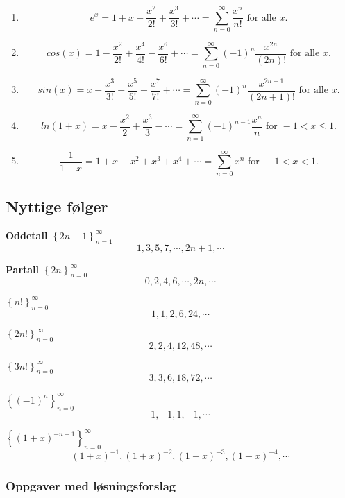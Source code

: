 \documentclass[11pt]{article}
\theoremstyle{definition}
\theoremstyle{definition}
\theoremstyle{definition}
\theoremstyle{definition}
\theoremstyle{definition}
\theoremstyle{definition}
\begin{document}
		\begin{enumerate}
			\item \[e^x=1+x+\dfrac{x^2}{2!}+\dfrac{x^3}{3!}+\cdots=\sum_{n=0}^{\infty}\dfrac{x^n}{n!}\text{ for alle }x. \]
			\item
			\[cos(x)=1-\dfrac{x^2}{2!}+\dfrac{x^4}{4!}-\dfrac{x^6}{6!}+\cdots =\sum_{n=0}^{\infty}(-1)^n\dfrac{x^{2n}}{(2n)!} \text{ for alle }x. \]
			\item
			\[sin(x)=x-\dfrac{x^3}{3!}+\dfrac{x^5}{5!}-\dfrac{x^7}{7!}+\cdots=\sum_{n=0}^{\infty}(-1)^n\dfrac{x^{2n+1}}{(2n+1)!}\text{ for alle }x. \]
			\item
			\[ln(1+x)=x-\dfrac{x^2}{2}+\dfrac{x^3}{3}-\cdots =\sum_{n=1}^{\infty}(-1)^{n-1} \dfrac{x^n}{n} \text{ for }-1<x\leq 1. \]
			\item \[\dfrac{1}{1-x}=1+x+x^2+x^3+x^4+\cdots=\sum_{n=0}^{\infty}x^n \text{ for }-1<x< 1.\]
		\end{enumerate}
		
		\newpage
		
		\subsection{Nyttige følger}
		\textbf{Oddetall}
		\(\left\lbrace 2n+1 \right\rbrace_{n=1}^{\infty}\)
		\[1,3,5,7,\cdots,2n+1,\cdots\]		
		
		\textbf{Partall} \(\left\lbrace 2n\right\rbrace_{n=0}^{\infty}\)
		\[0,2,4,6,\cdots,2n,\cdots\]
		
		\(\left\lbrace n! \right\rbrace_{n=0}^{\infty}\)
		\[1,1,2,6,24,\cdots \]
		
		\(\left\lbrace 2n! \right\rbrace_{n=0}^{\infty}\)
		\[2,2,4,12,48,\cdots \]
		 
		\(\left\lbrace 3n! \right\rbrace_{n=0}^{\infty}\)
		\[3,3,6,18,72,\cdots \]
		 
    	\(\left\lbrace (-1)^{n} \right\rbrace_{n=0}^{\infty}\)
	    \[1,-1,1,-1,\cdots\]
		  
		\(\left\lbrace (1+x)^{-n-1} \right\rbrace_{n=0}^{\infty}\)
		\[(1+x)^{-1},(1+x)^{-2},(1+x)^{-3},(1+x)^{-4},\cdots\]
		\newpage
		
		
		\subsubsection{Oppgaver med løsningsforslag}
		
\end{document}
